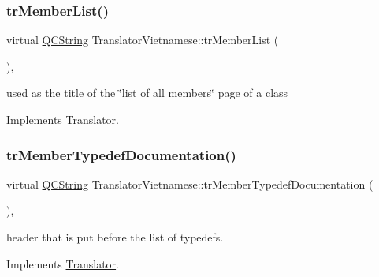 \mbox{\label{class_translator_vietnamese_a66968ded6a055c810008d50dc3800409}} 
\subsubsection{\texorpdfstring{trMemberList()}{trMemberList()}}
{\footnotesize\ttfamily virtual \mbox{\hyperlink{class_q_c_string}{Q\+C\+String}} Translator\+Vietnamese\+::tr\+Member\+List (\begin{DoxyParamCaption}{ }\end{DoxyParamCaption})\hspace{0.3cm}{\ttfamily [inline]}, {\ttfamily [virtual]}}

used as the title of the \char`\"{}list of all members\char`\"{} page of a class 

Implements \mbox{\hyperlink{class_translator}{Translator}}.

\mbox{\label{class_translator_vietnamese_ac2b22a5b4506767f25df82a0903bebb0}} 
\subsubsection{\texorpdfstring{trMemberTypedefDocumentation()}{trMemberTypedefDocumentation()}}
{\footnotesize\ttfamily virtual \mbox{\hyperlink{class_q_c_string}{Q\+C\+String}} Translator\+Vietnamese\+::tr\+Member\+Typedef\+Documentation (\begin{DoxyParamCaption}{ }\end{DoxyParamCaption})\hspace{0.3cm}{\ttfamily [inline]}, {\ttfamily [virtual]}}

header that is put before the list of typedefs. 

Implements \mbox{\hyperlink{class_translator}{Translator}}.

\mbox{\label{class_translator_vietnamese_a82c2166b4643231f5915b48e7e6f8f85}} 
